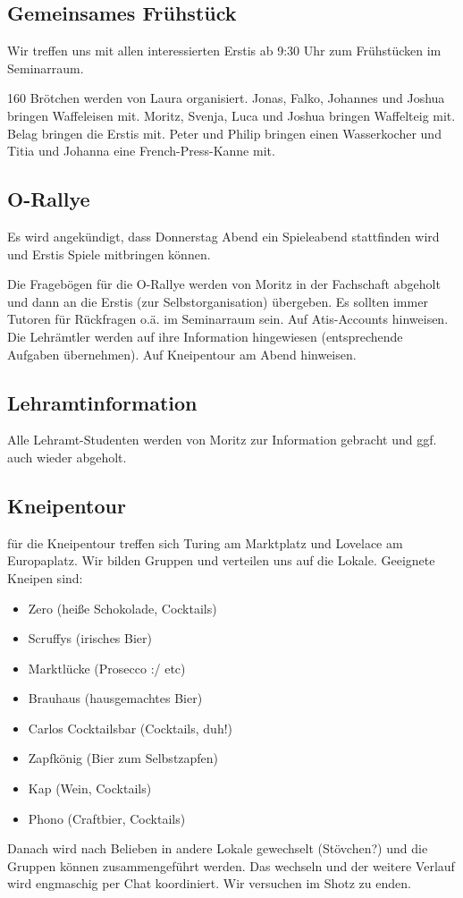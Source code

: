 \documentclass[10pt,twocolumn,ngerman]{scrartcl}
\begin{document}
\subsection{Gemeinsames Frühstück}

Wir treffen uns mit allen interessierten Erstis ab 9:30 Uhr zum Frühstücken
im Seminarraum.

160 Brötchen werden von Laura organisiert. Jonas, Falko, Johannes
und Joshua bringen Waffeleisen mit. Moritz, Svenja, Luca und Joshua
bringen Waffelteig mit. Belag bringen die Erstis mit. Peter und Philip
bringen einen Wasserkocher und Titia und Johanna eine French-Press-Kanne
mit.

\subsection{O-Rallye}

Es wird angekündigt, dass Donnerstag Abend ein Spieleabend stattfinden
wird und Erstis Spiele mitbringen können.

Die Fragebögen für die O-Rallye werden von Moritz in der Fachschaft
abgeholt und dann an die Erstis (zur Selbstorganisation) übergeben.
Es sollten immer Tutoren für Rückfragen o.ä. im Seminarraum sein.
Auf Atis-Accounts hinweisen. Die Lehrämtler werden auf ihre Information
hingewiesen (entsprechende Aufgaben übernehmen). Auf Kneipentour am
Abend hinweisen.

\subsection{Lehramtinformation}

Alle Lehramt-Studenten werden von Moritz zur Information gebracht
und ggf. auch wieder abgeholt.

\subsection{Kneipentour}

für die Kneipentour treffen sich Turing am Marktplatz und Lovelace
am Europaplatz. Wir bilden Gruppen und verteilen uns auf die Lokale.
Geeignete Kneipen sind:
\begin{itemize}
\item Zero (heiße Schokolade, Cocktails)
\item Scruffys (irisches Bier)
\item Marktlücke (Prosecco :/ etc)
\item Brauhaus (hausgemachtes Bier)
\item Carlos Cocktailsbar (Cocktails, duh!)
\item Zapfkönig (Bier zum Selbstzapfen)
\item Kap (Wein, Cocktails)
\item Phono (Craftbier, Cocktails)
\end{itemize}
Danach wird nach Belieben in andere Lokale gewechselt (Stövchen?)
und die Gruppen können zusammengeführt werden. Das wechseln und der
weitere Verlauf wird engmaschig per Chat koordiniert. Wir versuchen
im Shotz zu enden. 
\end{document}

